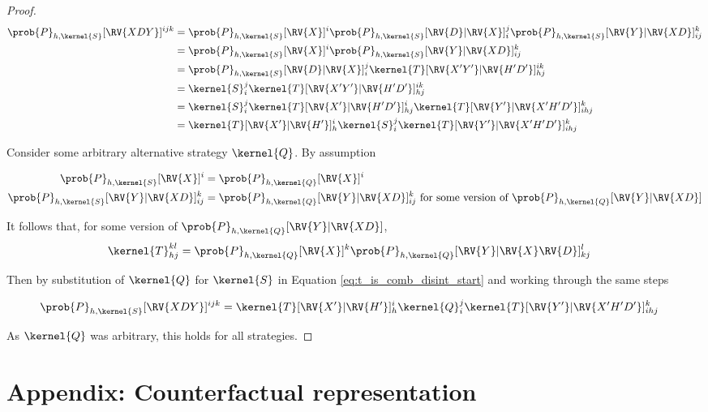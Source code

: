 \begin{proof}
\begin{align}
    \prob{P}_{h,\kernel{S}}[\RV{XDY}]^{ijk} &= \prob{P}_{h,\kernel{S}}[\RV{X}]^i\prob{P}_{h,\kernel{S}}[\RV{D}|\RV{X}]_i^{j} \prob{P}_{h,\kernel{S}}[\RV{Y}|\RV{XD}]_{ij}^{k}\label{eq:t_is_comb_disint_start}\\
     &=  \prob{P}_{h,\kernel{S}}[\RV{X}]^i\prob{P}_{h,\kernel{S}}[\RV{Y}|\RV{XD}]_{ij}^{k}\\
     &= \prob{P}_{h,\kernel{S}}[\RV{D}|\RV{X}]_i^{j} \kernel{T}[\RV{X'Y'}|\RV{H'D'}]_{hj}^{ik}\\
     &= \kernel{S}_i^j \kernel{T}[\RV{X'Y'}|\RV{H'D'}]_{hj}^{ik}\\
     &= \kernel{S}_i^j \kernel{T}[\RV{X'}|\RV{H'D'}]_{hj}^{i} \kernel{T}[\RV{Y'}|\RV{X'H'D'}]_{ihj}^k\\
     &= \kernel{T}[\RV{X'}|\RV{H'}]_{h}^{i} \kernel{S}_i^j  \kernel{T}[\RV{Y'}|\RV{X'H'D'}]_{ihj}^k\label{eq:t_is_comb_disint_end}
\end{align}

Consider some arbitrary alternative strategy $\kernel{Q}$. By assumption

\begin{align}
    \prob{P}_{h,\kernel{S}}[\RV{X}]^{i} &= \prob{P}_{h,\kernel{Q}}[\RV{X}]^{i}\\
    \prob{P}_{h,\kernel{S}}[\RV{Y}|\RV{XD}]_{ij}^k &= \prob{P}_{h,\kernel{Q}}[\RV{Y}|\RV{XD}]_{ij}^k\text{ for some version of }\prob{P}_{h,\kernel{Q}}[\RV{Y}|\RV{XD}]
\end{align}

It follows that, for some version of $\prob{P}_{h,\kernel{Q}}[\RV{Y}|\RV{XD}]$,
\begin{align}
    \kernel{T}_{hj}^{kl} &= \prob{P}_{h,\kernel{Q}}[\RV{X}]^k \prob{P}_{h,\kernel{Q}}[\RV{Y}|\RV{X}\RV{D}]^l_{kj} \label{eq:comb_disint_nonuniq}
\end{align}

Then by substitution of $\kernel{Q}$ for $\kernel{S}$ in Equation \ref{eq:t_is_comb_disint_start} and working through the same steps

\begin{align}
    \prob{P}_{h,\kernel{S}}[\RV{XDY}]^{ijk} &= \kernel{T}[\RV{X'}|\RV{H'}]_{h}^{i} \kernel{Q}_i^j  \kernel{T}[\RV{Y'}|\RV{X'H'D'}]_{ihj}^k
\end{align}

As $\kernel{Q}$ was arbitrary, this holds for all strategies.
\end{proof}

\section{Appendix: Counterfactual representation}\label{sec:pot_rep}


